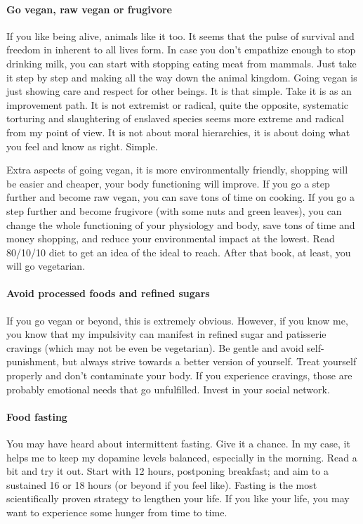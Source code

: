 \documentclass{article}
\begin{document}
\paragraph{Go vegan, raw vegan or frugivore}
If you like being alive, animals like it too. It seems that the pulse of survival and freedom in inherent to all lives form. In case you don’t empathize enough to stop drinking milk, you can start with stopping eating meat from mammals. Just take it step by step and making all the way down the animal kingdom. Going vegan is just showing care and respect for other beings. It is that simple. Take it is as an improvement path. It is not extremist or radical, quite the opposite, systematic torturing and slaughtering of enslaved species seems more extreme and radical from my point of view. It is not about moral hierarchies, it is about doing what you feel and know as right. Simple. 

Extra aspects of going vegan, it is more environmentally friendly, shopping will be easier and cheaper, your body functioning will improve. If you go a step further and become raw vegan, you can save tons of time on cooking. If you go a step further and become frugivore (with some nuts and green leaves), you can change the whole functioning of your physiology and body, save tons of time and money shopping, and reduce your environmental impact at the lowest. Read 80/10/10 diet to get an idea of the ideal to reach. After that book, at least, you will go vegetarian.

\paragraph{Avoid processed foods and refined sugars}
If you go vegan or beyond, this is extremely obvious. However, if you know me, you know that my impulsivity can manifest in refined sugar and patisserie cravings (which may not be even be vegetarian). Be gentle and avoid self-punishment, but always strive towards a better version of yourself. Treat yourself properly and don’t contaminate your body. If you experience cravings, those are probably emotional needs that go unfulfilled. Invest in your social network. 
\paragraph{Food fasting}
You may have heard about intermittent fasting. Give it a chance. In my case, it helps me to keep my dopamine levels balanced, especially in the morning. Read a bit and try it out. Start with 12 hours, postponing breakfast; and aim to a sustained 16 or 18 hours (or beyond if you feel like). Fasting is the most scientifically proven strategy to lengthen your life. If you like your life, you may want to experience some hunger from time to time.
\end{document}
